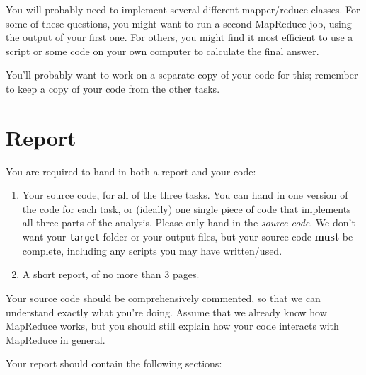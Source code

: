 \documentclass[a4paper,10pt]{article}
\begin{document}
  You will probably need to implement several different mapper/reduce classes. For some of these questions, you might want to run a second MapReduce job, using the output of your first one. For others, you might find it most efficient to use a script or some code on your own computer to calculate the final answer.

  You'll probably want to work on a separate copy of your code for this; remember to keep a copy of your code from the other tasks.


  \pagebreak
  \section{Report} \label{sec:report}

  You are required to hand in both a report and your code:
  
  \begin{enumerate}
    \item Your source code, for all of the three tasks. You can hand in one version of the code for each task, or (ideally) one single piece of code that implements all three parts of the analysis. Please only hand in the \emph{source code}. We don't want your \texttt{target} folder or your output files, but your source code \textbf{must} be complete, including any scripts you may have written/used.
    \item A short report, of no more than 3 pages.
  \end{enumerate}

  Your source code should be comprehensively commented, so that we can understand exactly what you're doing. Assume that we already know how
  MapReduce works, but you should still explain how your code interacts with MapReduce in general.
  
  Your report should contain the following sections:
  
\end{document}
